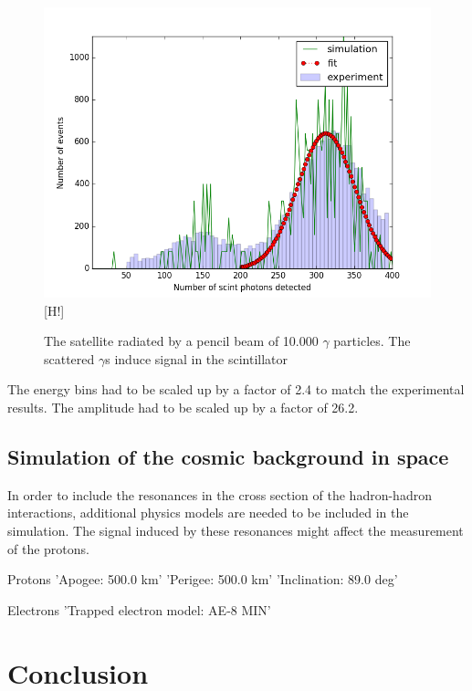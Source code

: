 \documentclass[12pt, a4paper,titlepage]{article}
\numberwithin{equation}{section}
\numberwithin{figure}{section}
\begin{document}
\begin{figure}
\includegraphics[width=150.0mm]{images/calibration_photon_yield.png}[H!]
\caption{The satellite radiated by a pencil beam of 10.000 $\gamma$ particles. The scattered $\gamma$s induce signal in the scintillator}
\end{figure}

The energy bins had to be scaled up by a factor of 2.4 to match the experimental results. The amplitude had to be scaled up by a factor of 26.2.

\pagebreak



\subsection{Simulation of the cosmic background in space}

In order to include the resonances in the cross section of the hadron-hadron interactions, additional physics models are needed to be included in the simulation. The signal induced by these resonances might affect the measurement of the protons.

Protons
'Apogee: 500.0 km'
'Perigee: 500.0 km'
'Inclination: 89.0 deg'

Electrons
'Trapped electron model: AE-8 MIN'

\pagebreak
\section{Conclusion}
\end{document}
